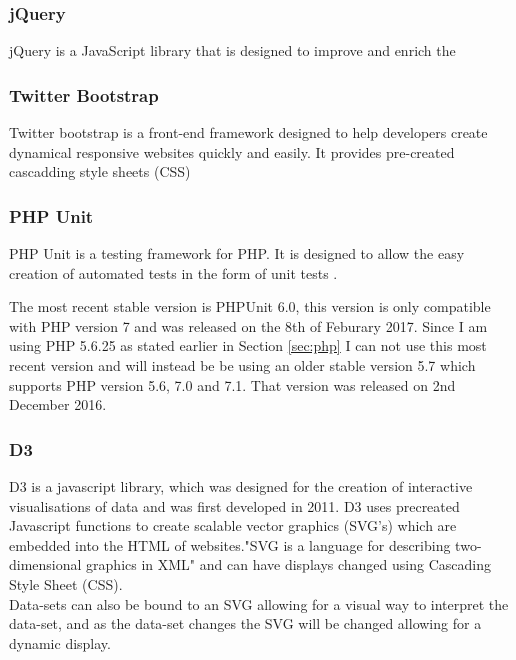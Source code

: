 \documentclass[12pt]{article}  %
\begin{document}
\subsubsection{jQuery}
jQuery is a JavaScript library that is designed to improve and enrich the 



\subsubsection{Twitter Bootstrap}
Twitter bootstrap is a front-end framework \cite{noauthor_bootstrap_nodate} designed to help developers create dynamical responsive websites quickly and easily. It provides pre-created cascadding style sheets (CSS)

\subsubsection{PHP Unit}

PHP Unit is a testing framework for PHP. It is designed to allow the easy creation of automated tests in the form of unit tests \cite{bergmann2005phpunit}. 

The most recent stable version is PHPUnit 6.0, this version is only compatible with PHP version 7 and was released on the 8th of Feburary 2017. Since I am using PHP 5.6.25 as stated earlier in Section \ref{sec:php} I can not use this most recent version and will instead be be using an older stable version 5.7 which supports PHP version 5.6, 7.0 and 7.1. That version was released on 2nd December 2016.



\subsubsection{D3}
D3 \cite{bostock_d3.js_nodate} is a javascript library, which was designed for the creation of interactive visualisations of data and was first developed in 2011. D3 uses precreated Javascript functions to create scalable vector graphics (SVG's) which are embedded into the HTML of websites."SVG is a language for describing two-dimensional graphics in XML"\cite{ferraiolo_scalable_2000} and can have displays changed  using Cascading Style Sheet (CSS).  \\
Data-sets can also be bound to an SVG allowing for a visual way to interpret the data-set, and as the data-set changes the SVG will be changed allowing for a dynamic display.
\end{document}
